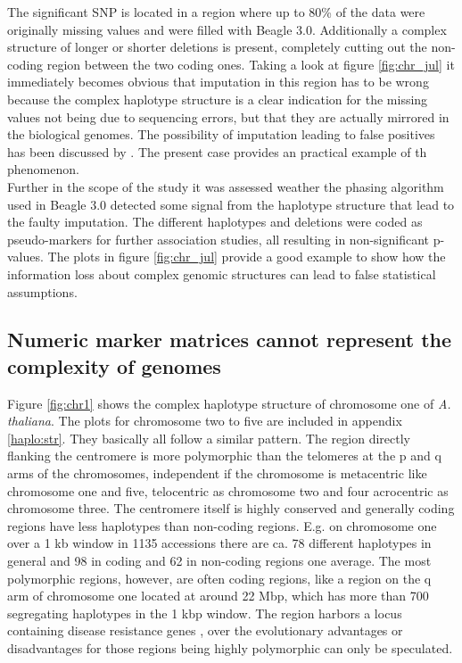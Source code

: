 The significant SNP is located in a region where up to 80\% of the data were originally
missing values and were filled with Beagle 3.0. Additionally a complex structure of longer
or shorter deletions is present, completely cutting out the non-coding region between the
two coding ones. Taking a look at figure \ref{fig:chr_jul} it immediately becomes obvious
that imputation in this region has to be wrong because the complex haplotype structure is
a clear indication for the missing values not being due to sequencing errors, but that
they are actually mirrored in the biological genomes. The possibility of imputation
leading to false positives has been discussed by \cite{lin2010new}. The present case
provides an practical example of th phenomenon. \\
Further in the scope of the study it was assessed weather the phasing algorithm used in
Beagle 3.0 detected some signal from the haplotype structure that lead to the faulty
imputation. The different haplotypes and deletions were coded as pseudo-markers for
further association studies, all resulting in non-significant p-values. The plots in
figure \ref{fig:chr_jul} provide a good example to show how the information loss about
complex genomic structures can lead to false statistical assumptions.

\subsection{Numeric marker matrices cannot represent the complexity of genomes}

Figure \ref{fig:chr1} shows the complex haplotype structure of chromosome one of
\textit{A. thaliana}. The plots for chromosome two to five are included in appendix
\ref{haplo:str}. They basically all follow a similar pattern. The region directly flanking
the centromere is more polymorphic than the telomeres at the p and q arms of the
chromosomes, independent if the chromosome is metacentric like chromosome one and five,
telocentric as chromosome two and four acrocentric as chromosome three. The centromere
itself is highly conserved and generally coding regions have less haplotypes than
non-coding regions. E.g. on chromosome one over a 1 kb window in 1135 accessions there are
ca. 78 different haplotypes in general and 98 in coding and 62 in non-coding regions one
average. The most polymorphic regions, however, are often coding regions, like a region on
the q arm of chromosome one located at around 22 Mbp, which has more than 700 segregating
haplotypes in the 1 kbp window. The region harbors a locus containing disease resistance
genes \cite{cheng2017araport11}, over the evolutionary advantages or disadvantages for
those regions being highly polymorphic can only be speculated.


